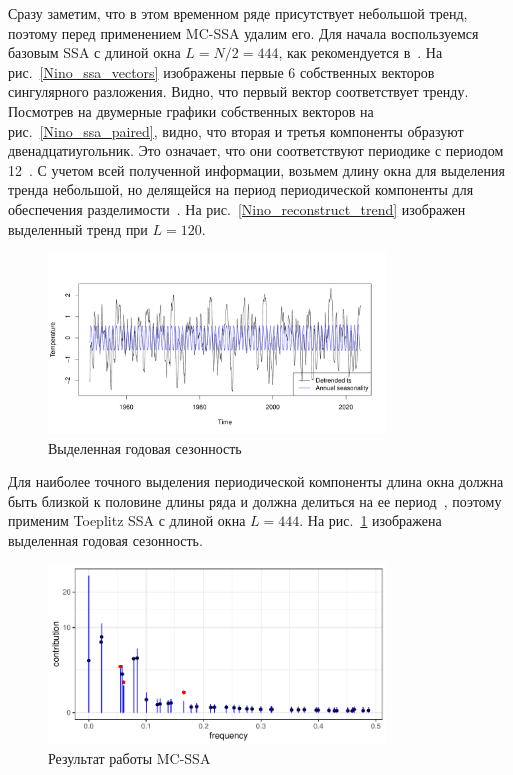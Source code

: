 \documentclass[specialist,
substylefile = spbu_report.rtx,
subf,href,colorlinks=true, 12pt]{disser}
\theoremstyle{definition}
\begin{document}
Сразу заметим, что в этом временном ряде присутствует небольшой тренд, поэтому перед применением MC-SSA удалим его. Для начала воспользуемся базовым SSA с длиной окна $L=N/2=444$, как рекомендуется в~\cite{ssa_an}. На рис.~\ref{Nino_ssa_vectors} изображены первые 6 собственных векторов сингулярного разложения. Видно, что первый вектор соответствует тренду. Посмотрев на двумерные графики собственных векторов на рис.~\ref{Nino_ssa_paired}, видно, что вторая и третья компоненты образуют двенадцатиугольник. Это означает, что они соответствуют периодике с периодом 12~\cite{ssa_an}. С учетом всей полученной информации, возьмем длину окна для выделения тренда небольшой, но делящейся на период периодической компоненты для обеспечения разделимости~\cite{ssa_an}. На рис.~\ref{Nino_reconstruct_trend} изображен выделенный тренд при $L=120$.
\begin{figure}[h!]
	\centering
	\includegraphics[width=0.8\textwidth]{img/Nino_reconstruct_season.pdf}
	\caption{Выделенная годовая сезонность}
	\label{Nino_reconstruct_season}
\end{figure}
Для наиболее точного выделения периодической компоненты длина окна должна быть близкой к половине длины ряда и должна делиться на ее период~\cite{ssa_an}, поэтому применим Toeplitz SSA с длиной окна $L=444$. На рис.~\ref{Nino_reconstruct_season} изображена выделенная годовая сезонность.
\begin{figure}
	\centering
	\includegraphics[width=0.8\textwidth]{img/Nino_mcssa.pdf}
	\caption{Результат работы MC-SSA}
	\label{Nino_mcssa}
\end{figure}
\end{document}

